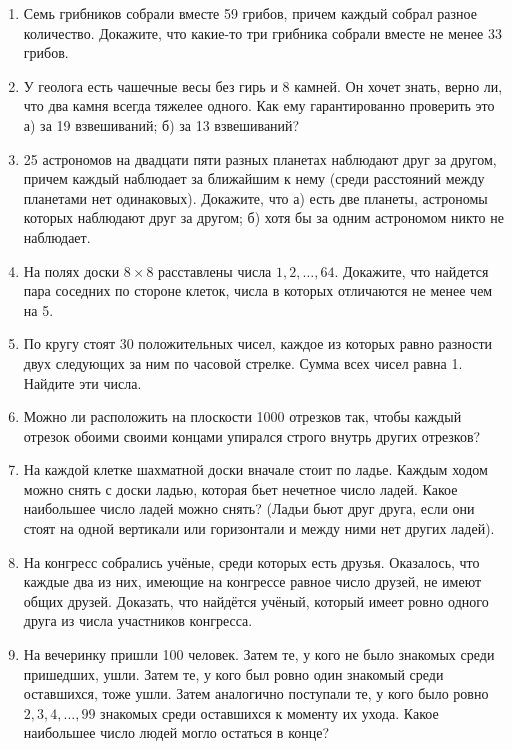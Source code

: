 \documentclass{article}
\begin{document}
\begin{enumerate}[label*=\protect\fbox{\arabic{enumi}}]
\item Семь грибников собрали вместе 59 грибов, причем каждый собрал разное количество. Докажите, что какие-то три грибника собрали вместе не менее 33 грибов.

\item У геолога есть чашечные весы без гирь и 8 камней. Он хочет знать, верно ли, что два камня всегда тяжелее одного. Как ему гарантированно проверить это а) за 19 взвешиваний; б) за 13 взвешиваний?

\item 25 астрономов на двадцати пяти разных планетах наблюдают друг за другом, причем каждый наблюдает за ближайшим к нему (среди расстояний между планетами нет одинаковых). Докажите, что а) есть две планеты, астрономы которых наблюдают друг за другом; б) хотя бы за одним астрономом никто не наблюдает.

\item На полях доски $8 \times 8$ расставлены числа $1, 2, \dots, 64$. Докажите, что найдется пара соседних по стороне клеток, числа в которых отличаются не менее чем на 5.

\item По кругу стоят 30 положительных чисел, каждое из которых равно разности двух следующих за ним по часовой стрелке. Сумма всех чисел равна 1. Найдите эти числа.

\item Можно ли расположить на плоскости 1000 отрезков так, чтобы каждый отрезок обоими своими концами упирался строго внутрь других отрезков?

\item На каждой клетке шахматной доски вначале стоит по ладье. Каждым ходом можно снять с доски ладью, которая бьет нечетное число ладей. Какое наибольшее число ладей можно снять? (Ладьи бьют друг друга, если они стоят на одной вертикали или горизонтали и между ними нет других ладей).

\item На конгресс собрались учёные, среди которых есть друзья. Оказалось, что каждые два из них, имеющие на конгрессе равное число друзей, не имеют общих друзей. Доказать, что найдётся учёный, который имеет ровно одного друга из числа участников конгресса.

\item На вечеринку пришли 100 человек. Затем те, у кого не было знакомых среди пришедших, ушли. Затем те, у кого был ровно один знакомый среди оставшихся, тоже ушли. Затем аналогично поступали те, у кого было ровно $2, 3, 4, \dots, 99$ знакомых среди оставшихся к моменту их ухода. 
Какое наибольшее число людей могло остаться в конце?
	
	
\end{enumerate}
\end{document}
